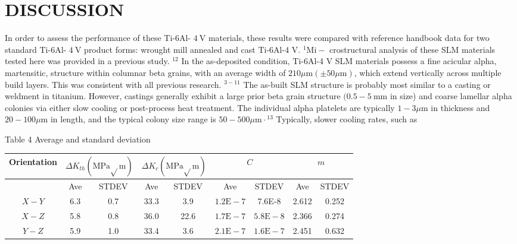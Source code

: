 \documentclass[10pt]{article}
\begin{document}
\section*{DISCUSSION}
In order to assess the performance of these Ti-6Al- $4 \mathrm{~V}$ materials, these results were compared with reference handbook data for two standard Ti-6Al- $4 \mathrm{~V}$ product forms: wrought mill annealed and cast Ti-6Al-4 V. ${ }^{1} \mathrm{Mi}-$ crostructural analysis of these SLM materials tested here was provided in a previous study. ${ }^{12}$ In the as-deposited condition, Ti-6Al-4 V SLM materials possess a fine acicular alpha, martensitic, structure within columnar beta grains, with an average width of $210 \mu \mathrm{m}( \pm 50 \mu \mathrm{m})$, which extend vertically across multiple build layers. This was consistent with all previous research. ${ }^{3-11}$ The as-built SLM structure is probably most similar to a casting or weldment in titanium. However, castings generally exhibit a large prior beta grain structure $(0.5-5 \mathrm{~mm}$ in size) and coarse lamellar alpha colonies via either slow cooling or post-process heat treatment. The individual alpha platelets are typically $1-3 \mu \mathrm{m}$ in thickness and $20-100 \mu \mathrm{m}$ in length, and the typical colony size range is $50-500 \mu \mathrm{m} \cdot{ }^{13}$ Typically, slower cooling rates, such as

Table 4 Average and standard deviation

\begin{center}
\begin{tabular}{|c|c|c|c|c|c|c|c|c|}
\hline
\multirow[b]{2}{*}{Orientation} & \multicolumn{2}{|c|}{$\Delta K_{t h}(\mathrm{MPa} \sqrt{ } \mathrm{m})$} & \multicolumn{2}{|c|}{$\Delta K_{c}(\mathrm{MPa} \sqrt{ } \mathrm{m})$} & \multicolumn{2}{|c|}{$C$} & \multicolumn{2}{|c|}{$m$} \\
\hline
 & Ave & STDEV & Ave & STDEV & Ave & STDEV & Ave & STDEV \\
\hline
$X-Y$ & 6.3 & 0.7 & 33.3 & 3.9 & $1.2 \mathrm{E}-7$ & 7.6E-8 & 2.612 & 0.252 \\
\hline
$X-Z$ & 5.8 & 0.8 & 36.0 & 22.6 & $1.7 \mathrm{E}-7$ & $5.8 \mathrm{E}-8$ & 2.366 & 0.274 \\
\hline
$Y-Z$ & 5.9 & 1.0 & 33.4 & 3.6 & $2.1 \mathrm{E}-7$ & $1.6 \mathrm{E}-7$ & 2.451 & 0.632 \\
\hline
\end{tabular}
\end{center}
\end{document}
